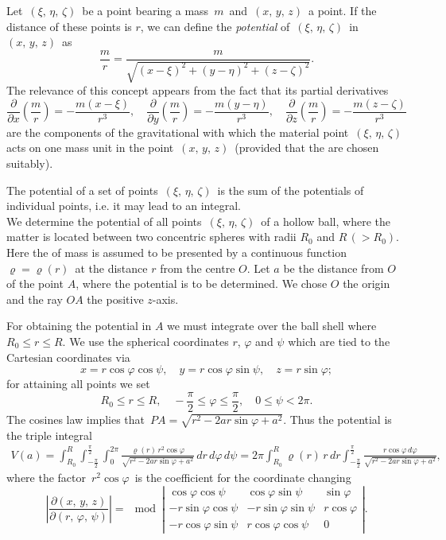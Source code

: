 \documentclass[12pt]{article}
\begin{document}

Let\, $(\xi,\,\eta,\,\zeta)$\, be a point bearing a mass\, $m$\, and\, $(x,\,y,\,z)$\, a  point.  If the distance of these points is $r$, we can define the {\em potential} of\, $(\xi,\,\eta,\,\zeta)$\, in\, $(x,\,y,\,z)$\, as
$$\frac{m}{r} = \frac{m}{\sqrt{(x-\xi)^2+(y-\eta)^2+(z-\zeta)^2}}.$$
The relevance of this concept appears from the fact that its partial derivatives
$$\frac{\partial}{\partial x}\!\left(\frac{m}{r}\right) = -\frac{m(x-\xi)}{r^3},\quad
\frac{\partial}{\partial y}\!\left(\frac{m}{r}\right) = -\frac{m(y-\eta)}{r^3},\quad
\frac{\partial}{\partial z}\!\left(\frac{m}{r}\right) = -\frac{m(z-\zeta)}{r^3}$$
are the components of the gravitational  with which the material point\, $(\xi,\,\eta,\,\zeta)$\, acts on one mass unit in the point\, $(x,\,y,\,z)$\, (provided that the  are chosen suitably).

The potential of a set of points\, $(\xi,\,\eta,\,\zeta)$\, is the sum of the potentials of individual points, i.e. it may lead to an integral.\\

We determine the potential of all points\, $(\xi,\,\eta,\,\zeta)$\, of a hollow ball, where the matter is located between two concentric spheres with radii $R_0$ and $R\, (>R_0)$.  Here the  of mass is assumed to be presented by a continuous function \, $\varrho = \varrho(r)$\, at the distance $r$ from the centre $O$.  Let $a$ be the distance from $O$ of the point $A$, where the potential is to be determined.  We chose $O$ the origin and the ray $OA$ the positive $z$-axis.

For obtaining the potential in $A$ we must integrate over the ball shell where $R_0 \le r \le R$.  We use the spherical coordinates $r$, $\varphi$ and $\psi$ which are tied to the Cartesian coordinates via
$$x = r\cos\varphi\cos\psi,\quad y = r\cos\varphi\sin\psi,\quad z = r\sin\varphi;$$
for attaining all points we set
$$R_0 \le r \le R,\quad -\frac{\pi}{2} \le \varphi \le \frac{\pi}{2},\quad
0 \le \psi < 2\pi.$$
The cosines law implies that\, $PA = \sqrt{r^2-2ar\sin\varphi+a^2}$.  Thus the potential is the triple integral
\begin{align}
V(a) = 
\int_{R_0}^R \int_{-\frac{\pi}{2}}^\frac{\pi}{2} \int_0^{2\pi}\!
\!\frac{\varrho(r)\,r^2\cos\varphi}{\sqrt{r^2-2ar\sin\varphi+a^2}}\,dr\,d\varphi\,d\psi
= 2\pi\int_{R_0}^R \varrho(r)\,r\,dr\int_{-\frac{\pi}{2}}^\frac{\pi}{2}
\frac{r\cos\varphi\,d\varphi}{\sqrt{r^2-2ar\sin\varphi+a^2}},
\end{align}
where the factor\, $r^2\cos\varphi$\, is the coefficient for the coordinate changing
$$\left|\frac{\partial(x,\,y,\,z)}{\partial(r,\,\varphi,\,\psi)}\right| =
\!\mod\!\left|\begin{matrix}
\cos\varphi\cos\psi & \cos\varphi\sin\psi & \sin\varphi \\
-r\sin\varphi\cos\psi & -r\sin\varphi\sin\psi & r\cos\varphi \\
-r\cos\varphi\sin\psi & r\cos\varphi\cos\psi & 0
\end{matrix}\right|.$$
\end{document}
